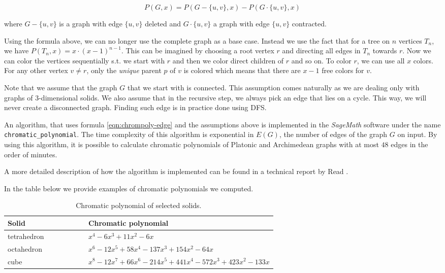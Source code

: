 \begin{equation}\label{eqn:chrompoly-edge}
    P(G,x) = P(G - \{u,v\},x) - P(G \cdot \{u,v\},x)
\end{equation}

where $G - \{u,v\}$ is a graph with edge $\{u,v\}$ deleted and $G \cdot \{u,v\}$ a graph with edge $\{u,v\}$ contracted. 

Using the formula above, we can no longer use the complete graph as a base case. Instead we use the fact that for a tree on $n$ vertices $T_n$, we have $P(T_n,x) = x \cdot (x-1)^{n-1}$. This can be imagined by choosing a root vertex $r$ and directing all edges in $T_n$ towards $r$. Now we can color the vertices sequentially s.t. we start with $r$ and then we color direct children of $r$ and so on. To color $r$, we can use all $x$ colors. For any other vertex $v \neq r$, only the \textit{unique} parent $p$ of $v$ is colored which means that there are $x-1$ free colors for $v$. 

Note that we assume that the graph $G$ that we start with is connected. This assumption comes naturally as we are dealing only with graphs of 3-dimensional solids. We also assume that in the recursive step, we always pick an edge that lies on a cycle. This way, we will never create a disconnected graph. Finding such edge is in practice done using DFS.


An algorithm, that uses formula \ref{eqn:chrompoly-edge} and the assumptions above is implemented in the \textit{SageMath} \cite{sagemath} software under the name \verb|chromatic_polynomial|. The time complexity of this algorithm is exponential in $E(G)$, the number of edges of the graph $G$ on input. By using this algorithm, it is possible to calculate chromatic polynomials of Platonic and Archimedean graphs with at most $48$ edges in the order of minutes.

A more detailed description of how the algorithm is implemented can be found in a technical report by Read \cite{read1987chromatic}.

In the table below we provide examples of chromatic polynomials we computed.

\begin{table}[H]
\centering
\begin{tabular}{lp{0.7\linewidth}}
\toprule
\textbf{Solid} & \textbf{Chromatic polynomial} \\
\midrule
tetrahedron & $x^{4} - 6x^{3} + 11x^{2} - 6x$ \\
octahedron & $x^{6} - 12x^{5} + 58x^{4} - 137x^{3} + 154x^{2} - 64x$ \\
cube & $x^{8} - 12x^{7} + 66x^{6} - 214x^{5} + 441x^{4} - 572x^{3} + 423x^{2} - 133x$ \\
\bottomrule
\end{tabular}
\caption{Chromatic polynomial of selected solids.}
\label{tab:selected-chrom-polys}
\end{table}
